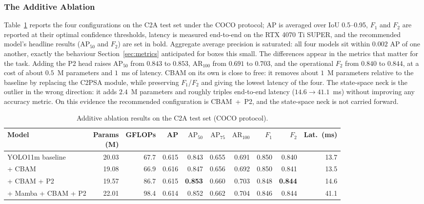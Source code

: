 \subsubsection{The Additive Ablation}
Table~\ref{tab:main} reports the four configurations on the C2A test set
under the COCO protocol; AP is averaged over IoU 0.5--0.95, $F_1$ and $F_2$
are reported at their optimal confidence thresholds, latency is measured
end-to-end on the RTX 4070 Ti SUPER, and the recommended model's headline
results ($\mathrm{AP}_{50}$ and $F_2$) are set in bold. Aggregate average
precision is saturated: all
four models sit within $0.002$ AP of one another, exactly the behaviour
Section~\ref{sec:metrics} anticipated for boxes this small. The differences
appear in the metrics that matter for the task. Adding the P2 head raises
$\mathrm{AP}_{50}$ from $0.843$ to $0.853$, $\mathrm{AR}_{100}$ from $0.691$
to $0.703$, and the operational $F_2$ from $0.840$ to $0.844$, at a cost of
about $0.5$~M parameters and $1$~ms of latency. CBAM on its own is close to
free: it removes about $1$~M parameters relative to the baseline by replacing
the C2PSA module, while preserving $F_1$/$F_2$ and giving the lowest latency
of the four. The state-space neck
is the outlier in the wrong direction: it adds $2.4$~M parameters and
roughly triples end-to-end latency ($14.6 \to 41.1$~ms) without improving
any accuracy metric. On this evidence the recommended configuration is
CBAM~+~P2, and the state-space neck is not carried forward.

\begin{table}[tbp]
  \centering
  \caption{Additive ablation results on the C2A test set (COCO protocol).}
  \label{tab:main}
  \small
  \setlength{\tabcolsep}{3pt}
  \begin{tabular}{|l|r|r|r|r|r|r|r|r|r|}
    \hline
    Model & \makecell{Params\\(M)} & GFLOPs & AP & $\mathrm{AP}_{50}$ & $\mathrm{AP}_{75}$ & $\mathrm{AR}_{100}$ & $F_1$ & $F_2$ & Lat.\ (ms) \\
    \hline
    YOLO11m baseline    & 20.03 & 67.7 & 0.615 & 0.843 & 0.655 & 0.691 & 0.850 & 0.840 & 13.7 \\ \hline
    + CBAM              & 19.08 & 66.9 & 0.616 & 0.847 & 0.656 & 0.692 & 0.850 & 0.841 & 13.5 \\ \hline
    + CBAM + P2         & 19.57 & 86.7 & 0.615 & \textbf{0.853} & 0.660 & 0.703 & 0.848 & \textbf{0.844} & 14.6 \\ \hline
    + Mamba + CBAM + P2 & 22.01 & 98.4 & 0.614 & 0.852 & 0.662 & 0.704 & 0.846 & 0.844 & 41.1 \\
    \hline
  \end{tabular}
\end{table}

